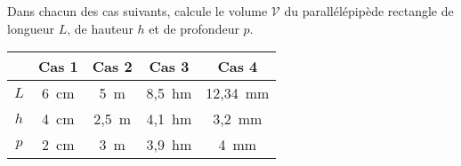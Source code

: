 Dans chacun des cas suivants, calcule le volume $\mathscr{V}$ du parallélépipède rectangle de longueur $L$, de hauteur $h$ et de profondeur $p$.
\begin{center}
  \begin{tabular}{|c|c|c|c|c|}
\cline{2-5}
\multicolumn{1}{c|}{}&Cas 1&Cas 2&Cas 3&Cas 4\\
\hline
$L$&6~cm&5~m&8,5~hm&12,34~mm\\
\hline
$h$&4~cm&2,5~m&4,1~hm&3,2~mm\\
\hline
$p$&2~cm&3~m&3,9~hm&4~mm\\
\hline
  \end{tabular}
\end{center}
